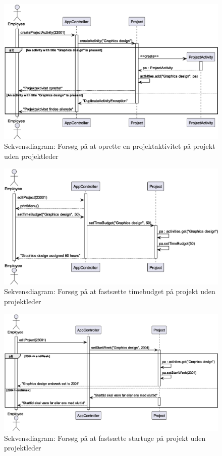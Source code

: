 \begin{figure}[H]
    \centering
    \caption{Sekvensdiagram: Forsøg på at oprette en projektaktivitet på projekt uden projektleder}\label{fig:sequence_create_PA_no_PL_1}
    \includegraphics[width = .75\textwidth]{Diagrams/createActivityNoPLCase1.eps}
\end{figure}
\begin{figure}[H]
    \centering
    \caption{Sekvensdiagram: Forsøg på at fastsætte timebudget på projekt uden projektleder}\label{fig:sequence_create_PA_no_PL_2}
    \includegraphics[width = .75\textwidth]{Diagrams/createActivityNoPLCase2.eps}
\end{figure}
\begin{figure}[H]
    \centering
    \caption{Sekvensdiagram: Forsøg på at fastsætte startuge på projekt uden projektleder}\label{fig:sequence_create_PA_no_PL_3}
    \includegraphics[width = .9\textwidth]{Diagrams/createActivityNoPLCase3.eps}
\end{figure}
